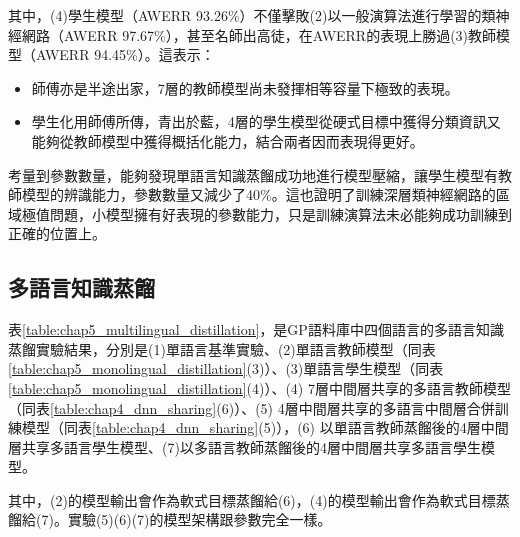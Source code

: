 其中，(4)學生模型（AWERR 93.26\%）不僅擊敗(2)以一般演算法進行學習的類神經網路（AWERR 97.67\%），甚至名師出高徒，在AWERR的表現上勝過(3)教師模型（AWERR 94.45\%）。這表示：
\begin{itemize}
\itemsep -2pt
 \item 師傅亦是半途出家，7層的教師模型尚未發揮相等容量下極致的表現。
 \item 學生化用師傅所傳，青出於藍，4層的學生模型從硬式目標中獲得分類資訊又能夠從教師模型中獲得概括化能力，結合兩者因而表現得更好。
\end{itemize}

考量到參數數量，能夠發現單語言知識蒸餾成功地進行模型壓縮，讓學生模型有教師模型的辨識能力，參數數量又減少了40\%。這也證明了訓練深層類神經網路的區域極值問題，小模型擁有好表現的參數能力，只是訓練演算法未必能夠成功訓練到正確的位置上。

\subsection{多語言知識蒸餾}

表\ref{table:chap5_multilingual_distillation}，是GP語料庫中四個語言的多語言知識蒸餾實驗結果，分別是(1)單語言基準實驗、(2)單語言教師模型（同表\ref{table:chap5_monolingual_distillation}(3)）、(3)單語言學生模型（同表\ref{table:chap5_monolingual_distillation}(4)）、(4) 7層中間層共享的多語言教師模型（同表\ref{table:chap4_dnn_sharing}(6)）、(5) 4層中間層共享的多語言中間層合併訓練模型（同表\ref{table:chap4_dnn_sharing}(5)），(6) 以單語言教師蒸餾後的4層中間層共享多語言學生模型、(7)以多語言教師蒸餾後的4層中間層共享多語言學生模型。

其中，(2)的模型輸出會作為軟式目標蒸餾給(6)，(4)的模型輸出會作為軟式目標蒸餾給(7)。實驗(5)(6)(7)的模型架構跟參數完全一樣。

